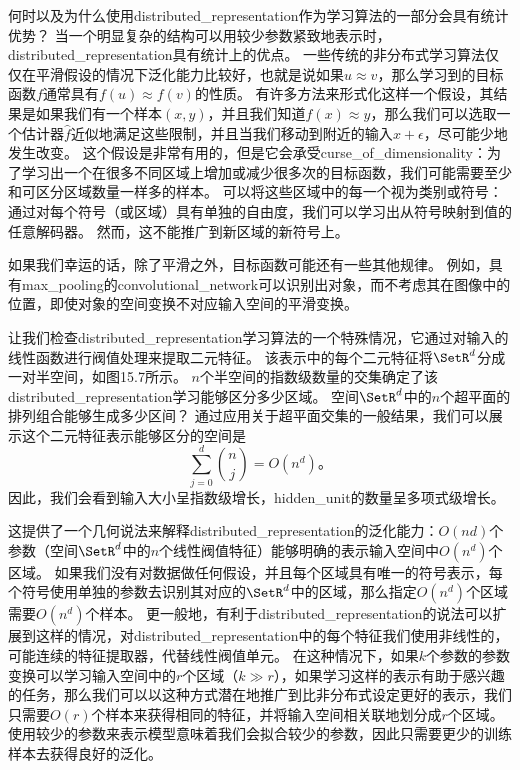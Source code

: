 
何时以及为什么使用\gls{distributed_representation}作为学习算法的一部分会具有统计优势？
当一个明显复杂的结构可以用较少参数紧致地表示时，\gls{distributed_representation}具有统计上的优点。
一些传统的非分布式学习算法仅仅在平滑假设的情况下泛化能力比较好，也就是说如果$u\approx v$，那么学习到的目标函数$f$通常具有$f(u) \approx f(v)$的性质。
有许多方法来形式化这样一个假设，其结果是如果我们有一个样本$(x,y)$，并且我们知道$f(x) \approx y$，那么我们可以选取一个估计器$\hat{f}$近似地满足这些限制，并且当我们移动到附近的输入$x + \epsilon$，尽可能少地发生改变。
这个假设是非常有用的，但是它会承受\gls{curse_of_dimensionality}：为了学习出一个在很多不同区域上增加或减少很多次的目标函数，我们可能需要至少和可区分区域数量一样多的样本。
可以将这些区域中的每一个视为类别或符号：通过对每个符号（或区域）具有单独的自由度，我们可以学习出从符号映射到值的任意解码器。
然而，这不能推广到新区域的新符号上。


如果我们幸运的话，除了平滑之外，目标函数可能还有一些其他规律。
例如，具有\gls{max_pooling}的\gls{convolutional_network}可以识别出对象，而不考虑其在图像中的位置，即使对象的空间变换不对应输入空间的平滑变换。


让我们检查\gls{distributed_representation}学习算法的一个特殊情况，它通过对输入的线性函数进行阀值处理来提取二元特征。
该表示中的每个二元特征将$\SetR^d$分成一对半空间，如图15.7所示。
$n$个半空间的指数级数量的交集确定了该\gls{distributed_representation}学习能够区分多少区域。
空间$\SetR^d$中的$n$个超平面的排列组合能够生成多少区间？
通过应用关于超平面交集的一般结果\citep{Zaslavsky-1975}，我们可以展示\citep{Pascanu+et+al-ICLR2014b}这个二元特征表示能够区分的空间是
\begin{equation}
	\sum_{j=0}^d \binom{n}{j} = O(n^d)。
\end{equation}
因此，我们会看到输入大小呈指数级增长，\gls{hidden_unit}的数量呈多项式级增长。


这提供了一个几何说法来解释\gls{distributed_representation}的泛化能力：$O(nd)$个参数（空间$\SetR^d$中的$n$个线性阀值特征）能够明确的表示输入空间中$O(n^d)$个区域。
如果我们没有对数据做任何假设，并且每个区域具有唯一的符号表示，每个符号使用单独的参数去识别其对应的$\SetR^d$中的区域，那么指定$O(n^d)$个区域需要$O(n^d)$个样本。
更一般地，有利于\gls{distributed_representation}的说法可以扩展到这样的情况，对\gls{distributed_representation}中的每个特征我们使用非线性的，可能连续的特征提取器，代替线性阀值单元。
在这种情况下，如果$k$个参数的参数变换可以学习输入空间中的$r$个区域（$k\gg r$），如果学习这样的表示有助于感兴趣的任务，那么我们可以以这种方式潜在地推广到比非分布式设定更好的表示，我们只需要$O(r)$个样本来获得相同的特征，并将输入空间相关联地划分成$r$个区域。
使用较少的参数来表示模型意味着我们会拟合较少的参数，因此只需要更少的训练样本去获得良好的泛化。



